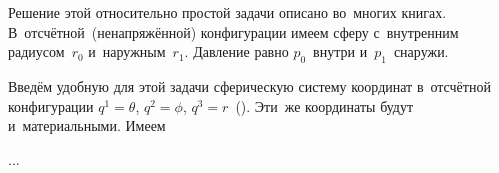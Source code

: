 

\label{para:hollowsphereunderpressure}

\begin{otherlanguage}{russian}

Решение этой относительно простой задачи описано во~многих книгах. В~отсчётной~(ненапряжённой) конфигурации имеем сферу с~внутренним радиусом~${r_0}$ и~наружным~${r_1}$. Давление равно $p_0$~внутри и~$p_1$~снаружи.

Введём удобную для этой задачи сферическую систему координат в~отсчётной конфигурации ${q^1 = \theta}$, ${q^2 = \phi}$, ${q^3 = r}$~(). Эти~же координаты будут и~материальными. Имеем

...



\end{otherlanguage}

\newpage



\label{para:stressesAsLagrangeMultipliers}

